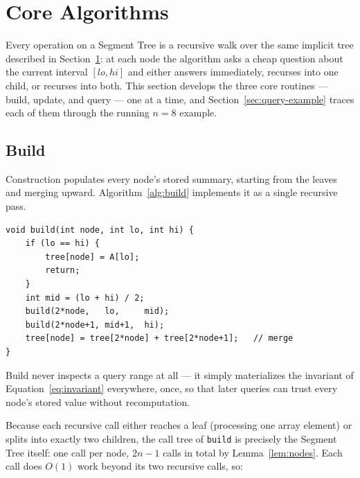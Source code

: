 
\section{Core Algorithms}
\label{sec:core-algorithms}
Every operation on a Segment Tree is a recursive walk over the same implicit tree described in Section~\ref{sec:core-algorithms}: at each node the algorithm asks a cheap question about the current interval $[lo,hi]$ and either answers immediately, recurses into one child, or recurses into both. This section develops the three core routines --- build, update, and query --- one at a time, and Section~\ref{sec:query-example} traces each of them through the running $n=8$ example.

\subsection{Build}
\label{sec:build}
Construction populates every node's stored summary, starting from the leaves and merging upward. Algorithm~\ref{alg:build} implements it as a single recursive pass.

\begin{lstlisting}[style=cpp, caption={Recursive build.}, label={alg:build}]
void build(int node, int lo, int hi) {
    if (lo == hi) {
        tree[node] = A[lo];
        return;
    }
    int mid = (lo + hi) / 2;
    build(2*node,   lo,     mid);
    build(2*node+1, mid+1,  hi);
    tree[node] = tree[2*node] + tree[2*node+1];   // merge
}
\end{lstlisting}

\begin{keyidea}
Build never inspects a query range at all --- it simply materializes the invariant of Equation~\eqref{eq:invariant} everywhere, once, so that later queries can trust every node's stored value without recomputation.
\end{keyidea}

Because each recursive call either reaches a leaf (processing one array element) or splits into exactly two children, the call tree of \texttt{build} is precisely the Segment Tree itself: one call per node, $2n-1$ calls in total by Lemma~\ref{lem:nodes}. Each call does $O(1)$ work beyond its two recursive calls, so:

